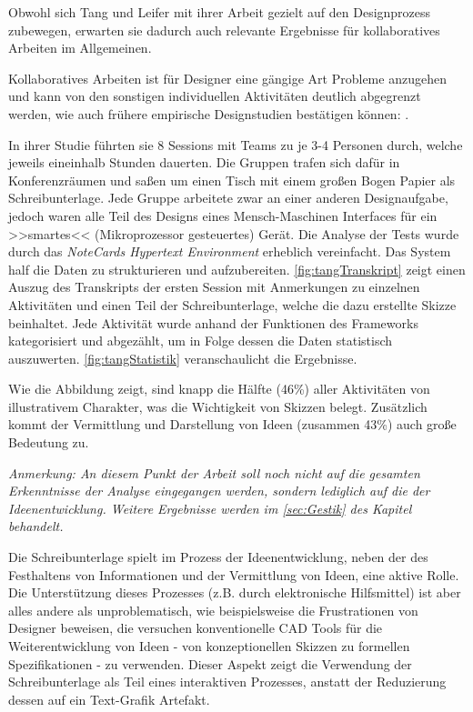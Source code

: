 \medskip Obwohl sich Tang und Leifer mit ihrer Arbeit gezielt auf den Designprozess zubewegen, erwarten sie dadurch auch relevante Ergebnisse für kollaboratives Arbeiten im Allgemeinen. \par Kollaboratives Arbeiten ist für Designer eine gängige Art Probleme anzugehen und kann von den sonstigen individuellen Aktivitäten deutlich abgegrenzt werden, wie auch frühere empirische Designstudien bestätigen können: \citep{Akin:1978, Lera:1983, Ullman:1987, Ballay:1987}.

\medskip In ihrer Studie führten sie 8 Sessions mit Teams zu je 3-4 Personen durch, welche jeweils eineinhalb Stunden dauerten. Die Gruppen trafen sich dafür in Konferenzräumen und saßen um einen Tisch mit einem großen Bogen Papier als Schreibunterlage. Jede Gruppe arbeitete zwar an einer anderen Designaufgabe, jedoch waren alle Teil des Designs eines Mensch-Maschinen Interfaces für ein >>smartes<< (Mikroprozessor gesteuertes) Gerät.
Die Analyse der Tests wurde durch das \emph{NoteCards Hypertext Environment} \citep{Halasz:1986:NN:29933.30859} erheblich vereinfacht. Das System half die Daten zu strukturieren und aufzubereiten. \autoref{fig:tangTranskript} zeigt einen Auszug des Transkripts der ersten Session mit Anmerkungen zu einzelnen Aktivitäten und einen Teil der Schreibunterlage, welche die dazu erstellte Skizze beinhaltet. Jede Aktivität wurde anhand der Funktionen des Frameworks kategorisiert und abgezählt, um in Folge dessen die Daten statistisch auszuwerten. \autoref{fig:tangStatistik} veranschaulicht die Ergebnisse.

\medskip Wie die Abbildung zeigt, sind knapp die Hälfte (46\%) aller Aktivitäten von illustrativem Charakter, was die Wichtigkeit von Skizzen belegt. Zusätzlich kommt der Vermittlung und Darstellung von Ideen (zusammen 43\%) auch große Bedeutung zu.\par
\medskip \emph{Anmerkung: \graffito{\(\clubsuit\)} An diesem Punkt der Arbeit soll noch nicht auf die gesamten Erkenntnisse der Analyse eingegangen werden, sondern lediglich auf die der Ideenentwicklung. Weitere Ergebnisse werden im \autoref{sec:Gestik} des Kapitel  behandelt.}

\medskip Die Schreibunterlage spielt im Prozess der Ideenentwicklung, neben der des Festhaltens von Informationen und der Vermittlung von Ideen, eine aktive Rolle. Die Unterstützung dieses Prozesses (z.B. durch elektronische Hilfsmittel) ist aber alles andere als unproblematisch, wie beispielsweise die Frustrationen von Designer beweisen, die versuchen konventionelle \ac{CAD} Tools für die Weiterentwicklung von Ideen - von konzeptionellen Skizzen zu formellen Spezifikationen - zu verwenden. Dieser Aspekt zeigt die Verwendung der Schreibunterlage als Teil eines interaktiven Prozesses, anstatt der Reduzierung dessen auf ein Text-Grafik Artefakt. 

